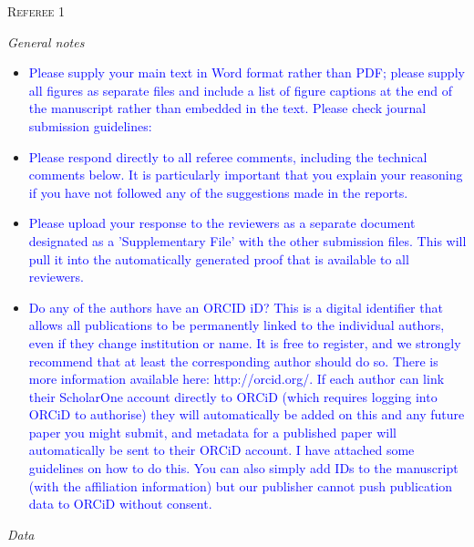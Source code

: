 \documentclass[12pt,letterpaper]{article}
\renewcommand{\section}[1]{%
\bigskip
\begin{center}
\begin{Large}
\normalfont\scshape #1
\medskip
\end{Large}
\end{center}}
\renewcommand{\subsection}[1]{%
\bigskip
\begin{center}
\begin{large}
\normalfont\itshape #1
\end{large}
\end{center}}
\begin{document}
\section{Referee 1}

\subsection{General notes}
\begin{itemize}
\item{\textcolor{blue}{Please supply your main text in Word format rather than PDF; please supply all figures as separate files and include a list of figure captions at the end of the manuscript rather than embedded in the text. Please check journal submission guidelines:}}

\item{\textcolor{blue}{Please respond directly to all referee comments, including the technical comments below. It is particularly important that you explain your reasoning if you have not followed any of the suggestions made in the reports.}}

\item{\textcolor{blue}{Please upload your response to the reviewers as a separate document designated as a 'Supplementary File' with the other submission files. This will pull it into the automatically generated proof that is available to all reviewers.}}

\item{\textcolor{blue}{Do any of the authors have an ORCID iD? This is a digital identifier that allows all publications to be permanently linked to the individual authors, even if they change institution or name. It is free to register, and we strongly recommend that at least the corresponding author should do so. There is more information available here: http://orcid.org/. If each author can link their ScholarOne account directly to ORCiD (which requires logging into ORCiD to authorise) they will automatically be added on this and any future paper you might submit, and metadata for a published paper will automatically be sent to their ORCiD account. I have attached some guidelines on how to do this. You can also simply add IDs to the manuscript (with the affiliation information) but our publisher cannot push publication data to ORCiD without consent.}}

\end{itemize}

\subsection{Data}
\end{document}
